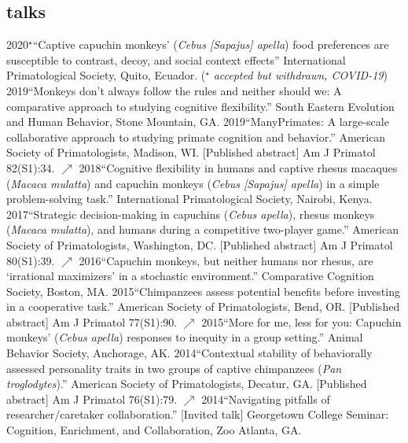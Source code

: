 \documentclass[]{friggeri-cv}
\begin{document}

\subsection{talks}

\begin{entrylist2}
  \entrytwo
    {2020{\Large${}^\star$}}{``Captive capuchin monkeys’ (\emph{Cebus [Sapajus] apella}) food preferences are susceptible to contrast, decoy, and social context effects'' International Primatological Society, Quito, Ecuador. ({\Large${}^\star$} \emph{accepted but withdrawn, COVID-19})}
  \entrytwo
    {2019}{``Monkeys don't always follow the rules and neither should we: A comparative approach to studying cognitive flexibility.'' South Eastern Evolution and Human Behavior, Stone Mountain, GA.}
  \entrytwo
    {2019}{``ManyPrimates: A large-scale collaborative approach to studying primate cognition and behavior.'' American Society of Primatologists, Madison, WI. [Published abstract] Am J Primatol 82(S1):34. \href{https://doi.org/10.1002/ajp.23114}{\small $\nearrow$}}
  \entrytwo
    {2018}{``Cognitive flexibility in humans and captive rhesus macaques (\emph{Macaca mulatta}) and capuchin monkeys (\emph{Cebus [Sapajus] apella}) in a simple problem-solving task.'' International Primatological Society, Nairobi, Kenya.}
  \entrytwo
    {2017}{``Strategic decision-making in capuchins (\emph{Cebus apella}), rhesus monkeys (\emph{Macaca mulatta}), and humans during a competitive two-player game.'' American Society of Primatologists, Washington, DC. [Published abstract] Am J Primatol 80(S1):39. \href{https://doi.org/10.1002/ajp.22942}{\small $\nearrow$}}
  \entrytwo
    {2016}{``Capuchin monkeys, but neither humans nor rhesus, are `irrational maximizers' in a stochastic environment.'' Comparative Cognition Society, Boston, MA.}
  \entrytwo
    {2015}{``Chimpanzees assess potential benefits before investing in a cooperative task.'' American Society of Primatologists, Bend, OR. [Published abstract] Am J Primatol 77(S1):90. \href{https://doi.org/10.1002/ajp.22494}{\small $\nearrow$}}
  \entrytwo
    {2015}{``More for me, less for you: Capuchin monkeys' (\emph{Cebus apella}) responses to inequity in a group setting.'' Animal Behavior Society, Anchorage, AK.}
  \entrytwo
    {2014}{``Contextual stability of behaviorally assessed personality traits in two groups of captive chimpanzees (\emph{Pan troglodytes}).'' American Society of Primatologists, Decatur, GA. [Published abstract] Am J Primatol 76(S1):79. \href{https://doi.org/10.1002/ajp.22382}{\small $\nearrow$}}
  \entrytwo
    {2014}{``Navigating pitfalls of researcher/caretaker collaboration.'' [Invited talk] Georgetown College Seminar: Cognition, Enrichment, and Collaboration, Zoo Atlanta, GA.}
\end{entrylist2}
\end{document}
